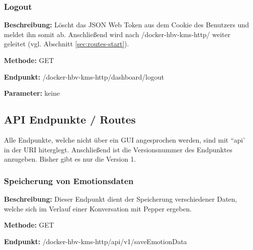 \subsubsection{Logout}
\label{sec:routes-logout}
\textbf{Beschreibung:} Löscht das JSON Web Token aus dem Cookie des Benutzers und meldet ihn somit ab. Anschließend wird nach /docker-hbv-kms-http/ weiter geleitet (vgl. Abschnitt \ref{sec:routes-start}).

\textbf{Methode:} GET

\textbf{Endpunkt:} /docker-hbv-kms-http/dashboard/logout

\textbf{Parameter:} keine

\dotfill






\subsection{API Endpunkte / Routes}
\label{sec:api-routes}
Alle Endpunkte, welche nicht über ein GUI angesprochen werden, sind mit ``api' in der URI hiterglegt. Anschließend ist die Versionsnummer des Endpunktes anzugeben. Bisher gibt es nur die Version 1.

\subsubsection{Speicherung von Emotionsdaten}
\label{sec:api-saveEmotionData}
\textbf{Beschreibung:} Dieser Endpunkt dient der Speicherung verschiedener Daten, welche sich im Verlauf einer Konversation mit Pepper ergeben.

\textbf{Methode:} GET

\textbf{Endpunkt:} /docker-hbv-kms-http/api/v1/saveEmotionData

